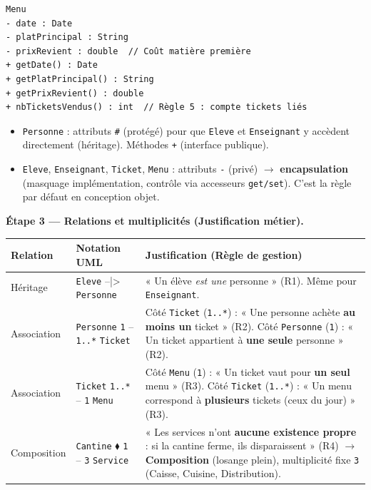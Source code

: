 \documentclass[11pt]{article}
\begin{document}
\begin{exoresolu}
\begin{lstlisting}[language=text]
Menu
- date : Date
- platPrincipal : String
- prixRevient : double  // Coût matière première
+ getDate() : Date
+ getPlatPrincipal() : String
+ getPrixRevient() : double
+ nbTicketsVendus() : int  // Règle 5 : compte tickets liés
\end{lstlisting}

\begin{attention}
\begin{itemize}
  \item \texttt{Personne} : attributs \texttt{\#} (protégé) pour que \texttt{Eleve} et \texttt{Enseignant} y accèdent directement (héritage). Méthodes \texttt{+} (interface publique).
  \item \texttt{Eleve}, \texttt{Enseignant}, \texttt{Ticket}, \texttt{Menu} : attributs \texttt{-} (privé) $\rightarrow$ \textbf{encapsulation} (masquage implémentation, contrôle via accesseurs \texttt{get/set}). C'est la règle par défaut en conception objet.
\end{itemize}
\end{attention}

\textbf{Étape 3 — Relations et multiplicités (Justification métier).}

\begin{center}
\begin{tabularx}{\linewidth}{|l|l|X|}\hline
\textbf{Relation} & \textbf{Notation UML} & \textbf{Justification (Règle de gestion)} \\\hline
Héritage & \texttt{Eleve} --|> \texttt{Personne} & « Un élève \emph{est une} personne » (R1). Même pour \texttt{Enseignant}. \\\hline
Association & \texttt{Personne} \texttt{1} -- \texttt{1..*} \texttt{Ticket} & Côté \texttt{Ticket} (\texttt{1..*}) : « Une personne achète \textbf{au moins un} ticket » (R2). Côté \texttt{Personne} (\texttt{1}) : « Un ticket appartient à \textbf{une seule} personne » (R2). \\\hline
Association & \texttt{Ticket} \texttt{1..*} -- \texttt{1} \texttt{Menu} & Côté \texttt{Menu} (\texttt{1}) : « Un ticket vaut pour \textbf{un seul} menu » (R3). Côté \texttt{Ticket} (\texttt{1..*}) : « Un menu correspond à \textbf{plusieurs} tickets (ceux du jour) » (R3). \\\hline
Composition & \texttt{Cantine} $\blacklozenge$ \texttt{1} -- \texttt{3} \texttt{Service} & « Les services n'ont \textbf{aucune existence propre} : si la cantine ferme, ils disparaissent » (R4) $\rightarrow$ \textbf{Composition} (losange plein), multiplicité fixe \texttt{3} (Caisse, Cuisine, Distribution). \\\hline
\end{tabularx}
\end{center}


\end{exoresolu}
\end{document}
